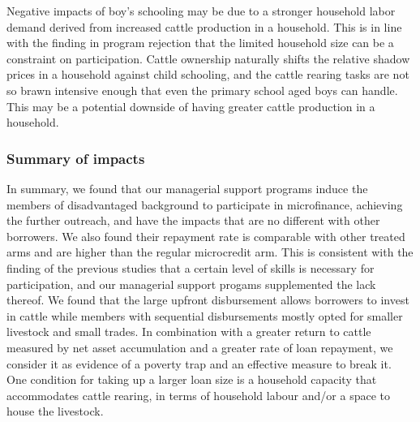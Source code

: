 	 Negative impacts of boy's schooling may be due to a stronger household labor demand derived from increased cattle production in a household. This is in line with the finding in program rejection that the limited household size can be a constraint on participation. Cattle ownership naturally shifts the relative shadow prices in a household against child schooling, and the cattle rearing tasks are not so brawn intensive enough that even the primary school aged boys can handle. This may be a potential downside of having greater cattle production in a household. 

\subsubsection{Summary of impacts}

	In summary, we found that our managerial support programs induce the members of disadvantaged background to participate in microfinance, achieving the further outreach, and have the impacts that are no different with other borrowers. We also found their repayment rate is comparable with other treated arms and are higher than the regular microcredit arm. This is consistent with the finding of the previous studies that a certain level of skills is necessary for participation, and our managerial support progams supplemented the lack thereof. We found that the large upfront disbursement allows borrowers to invest in cattle while members with sequential disbursements mostly opted for smaller livestock and small trades. In combination with a greater return to cattle measured by net asset accumulation and a greater rate of loan repayment, we consider it as evidence of a poverty trap and an effective measure to break it. One condition for taking up a larger loan size is a household capacity that accommodates cattle rearing, in terms of household labour and/or a space to house the livestock. 



